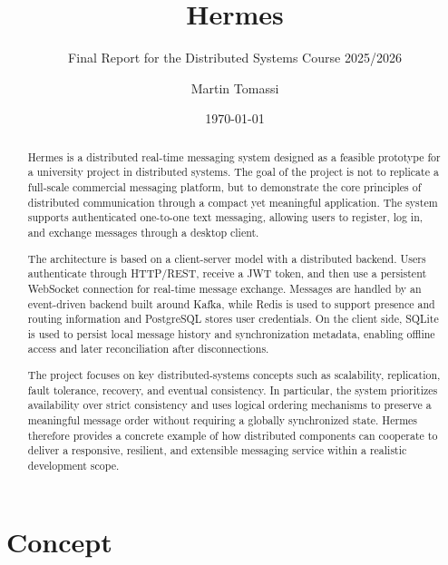 \documentclass{scrartcl}
\title{\LARGE
    Hermes
}
\subtitle{Final Report for the Distributed Systems Course 2025/2026}
\author{
    Martin Tomassi \\ \emailaddr{martin.tomassi@studio.unibo.it}
}
\date{\today}
\begin{document}
\maketitle

\begin{abstract}
	Hermes is a distributed real-time messaging system designed as a feasible prototype for a university project in distributed systems. The goal of the project is not to replicate a full-scale commercial messaging platform, but to demonstrate the core principles of distributed communication through a compact yet meaningful application. The system supports authenticated one-to-one text messaging, allowing users to register, log in, and exchange messages through a desktop client. 
	
	The architecture is based on a client-server model with a distributed backend. Users authenticate through HTTP/REST, receive a JWT token, and then use a persistent WebSocket connection for real-time message exchange. Messages are handled by an event-driven backend built around Kafka, while Redis is used to support presence and routing information and PostgreSQL stores user credentials. On the client side, SQLite is used to persist local message history and synchronization metadata, enabling offline access and later reconciliation after disconnections.
	
	The project focuses on key distributed-systems concepts such as scalability, replication, fault tolerance, recovery, and eventual consistency. In particular, the system prioritizes availability over strict consistency and uses logical ordering mechanisms to preserve a meaningful message order without requiring a globally synchronized state. Hermes therefore provides a concrete example of how distributed components can cooperate to deliver a responsive, resilient, and extensible messaging service within a realistic development scope.
\end{abstract}

\section{Concept}\label{concept}
\end{document}
